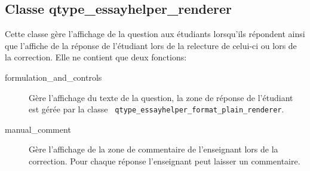 \subsection*{Classe qtype\_essayhelper\_renderer}
Cette classe g\`ere l'affichage de la question aux \'etudiants lorsqu'ils r\'epondent ainsi que l'affiche de la r\'eponse de l'\'etudiant lors de la relecture de celui-ci ou lors de la correction.
Elle ne contient que deux fonctions:
\begin{description}
  \item[formulation\_and\_controls] G\`ere l'affichage du texte de la question, la zone de r\'eponse de l'\'etudiant est g\'er\'ee par la classe \texttt{ qtype\_essayhelper\_format\_plain\_renderer}.
  \item[manual\_comment] G\`ere l'affichage de la zone de commentaire de l'enseignant lors de la correction. Pour chaque r\'eponse l'enseignant peut laisser un commentaire.
\end{description}
